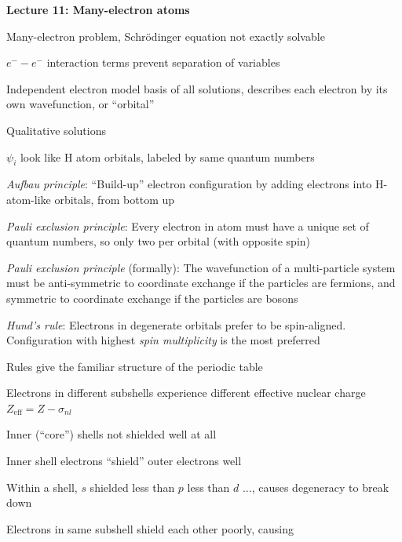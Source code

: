 \message{ !name(Outline.tex)}\documentclass[11pt]{article}
\begin{document}
\begin{outline}
\item{{\bf Lecture 11: Many-electron atoms}}
  \begin{outline}
  \item Many-electron problem, Schr\"odinger equation not exactly solvable
    \begin{outline}
      \item $e^- -e^-$ interaction terms prevent separation of variables
    \end{outline}
  \item Independent electron model basis of all solutions, describes each
    electron by its own wavefunction, or ``orbital''
  \item Qualitative solutions
    \begin{outline}
    \item $\psi_i$ look like H atom orbitals,  labeled by same quantum numbers
    \item {\em Aufbau principle}: ``Build-up'' electron configuration by adding
      electrons into H-atom-like orbitals, from bottom up
    \item {\em Pauli exclusion principle}: Every electron in atom must have a unique
      set of quantum numbers, so only two per orbital (with opposite spin)
    \item {\em Pauli exclusion principle} (formally): The wavefunction of a
      multi-particle system must be anti-symmetric to coordinate exchange if
      the particles are fermions, and symmetric to coordinate exchange if the
      particles are bosons
    \item {\em Hund's rule}: Electrons in degenerate orbitals prefer to be
      spin-aligned.  Configuration with highest {\em spin multiplicity} is the
      most preferred
    \item Rules give the familiar structure of the periodic table
    \item Electrons in different subshells experience different effective nuclear
      charge $Z_\mathrm{eff} = Z - \sigma_{nl}$
      \begin{outline}
      \item Inner (``core'') shells not shielded well at all
      \item Inner shell electrons ``shield'' outer electrons well
      \item Within a shell, $s$ shielded less than $p$ less than $d$ ...,
        causes degeneracy to break down
      \item Electrons in same subshell shield each other poorly, causing

\end{outline}
\end{outline}
\end{outline}
\end{outline}
\end{document}
